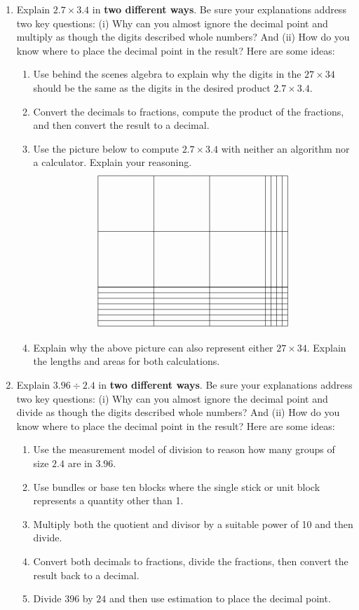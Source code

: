 \begin{problems}
\begin{enumerate}
\item Explain $2.7\times 3.4$ in \textbf{two different ways}.  Be sure your explanations address two key questions:  (i) Why can you almost ignore the decimal point and multiply as though the digits described whole numbers?  And (ii) How do you know where to place the decimal point in the result?  Here are some ideas:  
\begin{enumerate}
\item Use behind the scenes algebra to explain why the digits in the  $27\times 34$ should be the same as the digits in the desired product $2.7\times 3.4$.  
\item Convert the decimals to fractions, compute the product of the fractions, and then convert the result to a decimal.  
\item Use the picture below to compute $2.7\times 3.4$ with neither an algorithm nor a calculator.  Explain your reasoning.  
\[
\begin{tikzpicture}[scale=2]
\draw (0,0) grid (3,2);
\draw [xstep=1cm,ystep=1mm] (0,-0.7) grid (3,0);
\draw [xstep=1mm,ystep=1cm] (3,0) grid (3.4,2);
\draw [xstep=1mm,ystep=1mm] (3,-0.7) grid (3.4,0);
\end{tikzpicture}
\]
\item Explain why the above picture can also represent either $27\times 34$.  Explain the lengths and areas for both calculations.  

\end{enumerate}

\item Explain $3.96\div 2.4$ in \textbf{two different ways}.  Be sure your explanations address two key questions:  (i) Why can you almost ignore the decimal point and divide as though the digits described whole numbers?  And (ii) How do you know where to place the decimal point in the result?  Here are some ideas:  
\begin{enumerate}
\item Use the measurement model of division to reason how many groups of size $2.4$ are in $3.96$.
\item Use bundles or base ten blocks where the single stick or unit block represents a quantity other than 1.  
\item Multiply both the quotient and divisor by a suitable power of 10 and then divide.  
\item Convert both decimals to fractions, divide the fractions, then convert the result back to a decimal.  
\item Divide $396$ by $24$ and then use estimation to place the decimal point.  
\end{enumerate}

\end{enumerate}
\end{problems}



